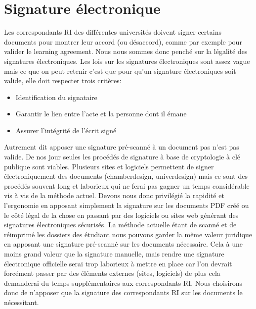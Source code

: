 \section{Signature électronique}
Les correspondants RI des différentes universités doivent signer certains documents pour montrer leur accord (ou désaccord), comme par exemple pour valider le learning agreement.
Nous nous sommes donc penché sur la légalité des signatures électroniques.
Les lois sur les signatures électroniques sont assez vague mais ce que on peut retenir c’est que pour qu’un signature électroniques soit valide, elle doit respecter trois critères:
\begin{itemize}
\item Identification du signataire
\item Garantir le lien entre l'acte et la personne dont il émane
\item Assurer l'intégrité de l'écrit signé
\end{itemize}
Autrement dit apposer une signature pré-scanné à un document pas n’est pas valide.
De nos jour seules les procédés de signature à base de cryptologie à clé publique sont viables.
Plusieurs sites et logiciels permettent de signer électroniquement des documents (chamberdesign, univerdesign) mais ce sont des procédés souvent long et laborieux qui ne ferai pas gagner un temps considérable vis à vis de la méthode actuel.
Devons nous donc privilégié la rapidité et l'ergonomie en apposant simplement la signature sur les documents PDF créé ou le côté légal de la chose en passant par des logiciels ou sites web générant des signatures électroniques sécurisés.
La méthode actuelle étant de scanné et de réimprimé les dossiers des étudiant nous pouvons garder la même valeur juridique en apposant une signature pré-scanné sur les documents nécessaire. Cela à une moins grand valeur que la signature manuelle, mais rendre une signature électronique officielle serai trop laborieux à mettre en place car l’on devrait forcément passer par des éléments externes (sites, logiciels) de plus cela demanderai du temps supplémentaires aux correspondants RI.
Nous choisirons donc de n’apposer que la signature des correspondants RI sur les documents le nécessitant.
